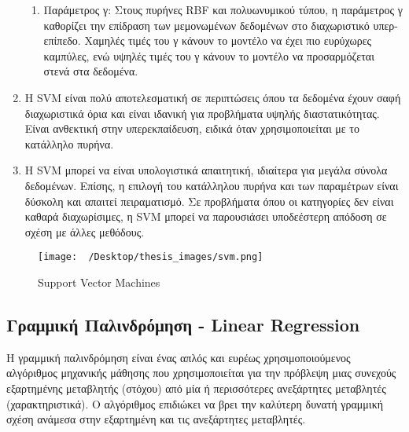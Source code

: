 \documentclass[diploma]{softlab-thesis}
\begin{document}
\begin{enumerate}
\begin{enumerate}
\item Παράμετρος γ: Στους πυρήνες RBF και πολυωνυμικού τύπου, η παράμετρος γ καθορίζει την επίδραση των μεμονωμένων δεδομένων στο διαχωριστικό υπερ-επίπεδο. Χαμηλές τιμές του γ κάνουν το μοντέλο να έχει πιο ευρύχωρες καμπύλες, ενώ υψηλές τιμές του γ κάνουν το μοντέλο να προσαρμόζεται στενά στα δεδομένα.
\end{enumerate}
\item Η SVM είναι πολύ αποτελεσματική σε περιπτώσεις όπου τα δεδομένα έχουν σαφή διαχωριστικά όρια και είναι ιδανική για προβλήματα υψηλής διαστατικότητας. Είναι ανθεκτική στην υπερεκπαίδευση, ειδικά όταν χρησιμοποιείται με το κατάλληλο πυρήνα.
\item Η SVM μπορεί να είναι υπολογιστικά απαιτητική, ιδιαίτερα για μεγάλα σύνολα δεδομένων. Επίσης, η επιλογή του κατάλληλου πυρήνα και των παραμέτρων είναι δύσκολη και απαιτεί πειραματισμό. Σε προβλήματα όπου οι κατηγορίες δεν είναι καθαρά διαχωρίσιμες, η SVM μπορεί να παρουσιάσει υποδεέστερη απόδοση σε σχέση με άλλες μεθόδους.
\end{enumerate}

\begin{figure}[H]
    \centering
    \texttt{[image: ~/Desktop/thesis\_images/svm.png]} %
    \caption{Support Vector Machines}
    \label{fig:your_image_label}
\end{figure}


\subsection{Γραμμική Παλινδρόμηση - Linear Regression}

Η γραμμική παλινδρόμηση είναι ένας απλός και ευρέως χρησιμοποιούμενος αλγόριθμος μηχανικής μάθησης που χρησιμοποιείται για την πρόβλεψη μιας συνεχούς εξαρτημένης μεταβλητής (στόχου) από μία ή περισσότερες ανεξάρτητες μεταβλητές (χαρακτηριστικά). Ο αλγόριθμος επιδιώκει να βρει την καλύτερη δυνατή γραμμική σχέση ανάμεσα στην εξαρτημένη και τις ανεξάρτητες μεταβλητές.
\end{document}
